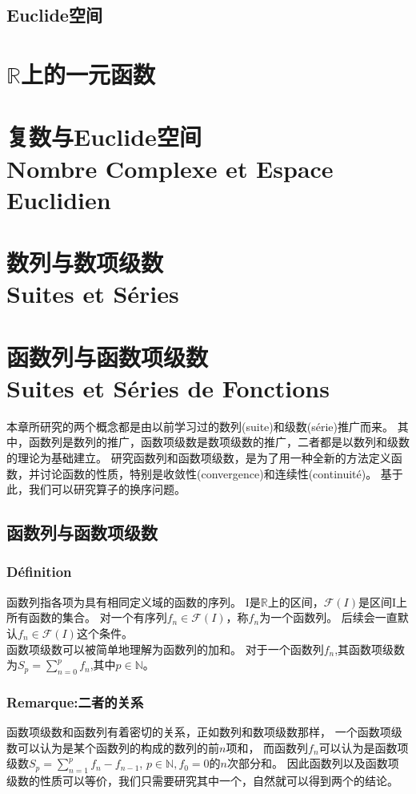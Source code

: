 \documentclass[12pt, a4paper, oneside]{ctexbook}
\begin{document}
  \section{Euclide空间}


\chapter{$\mathbb{R}$上的一元函数}

\chapter{复数与Euclide空间\\Nombre Complexe et Espace Euclidien}%

\chapter{数列与数项级数\\Suites et Séries}


\chapter{函数列与函数项级数\\Suites et Séries de Fonctions}
  本章所研究的两个概念都是由以前学习过的数列(suite)和级数(série)推广而来。
  其中，函数列是数列的推广，函数项级数是数项级数的推广，二者都是以数列和级数的理论为基础建立。
  研究函数列和函数项级数，是为了用一种全新的方法定义函数，并讨论函数的性质，特别是收敛性(convergence)和连续性(continuité)。
  基于此，我们可以研究算子的换序问题。

\section{函数列与函数项级数}
  \subsection{Définition}
  函数列指各项为具有相同定义域的函数的序列。
  I是$\mathbb{R}$上的区间，$\mathcal{F}(I)$是区间I上所有函数的集合。
  对一个有序列${f_n}\in\mathcal{F}(I)$，称${f_n}$为一个函数列。
  后续会一直默认${f_n}\in\mathcal{F}(I)$这个条件。\\

  函数项级数可以被简单地理解为函数列的加和。
  对于一个函数列${f_n}$,其函数项级数为$S_p=\sum_{n=0}^{p} f_n$,其中$p\in\mathbb{N}$。\\
  \subsection{Remarque:二者的关系}
  函数项级数和函数列有着密切的关系，正如数列和数项级数那样，
  一个函数项级数可以认为是某个函数列的构成的数列的前$n$项和，
  而函数列${f_n}$可以认为是函数项级数$S_p=\sum_{n=1}^{p} f_n-f_{n-1}$, $p\in\mathbb{N}, f_0=0$的$n$次部分和。
  因此函数列以及函数项级数的性质可以等价，我们只需要研究其中一个，自然就可以得到两个的结论。
\end{document}
